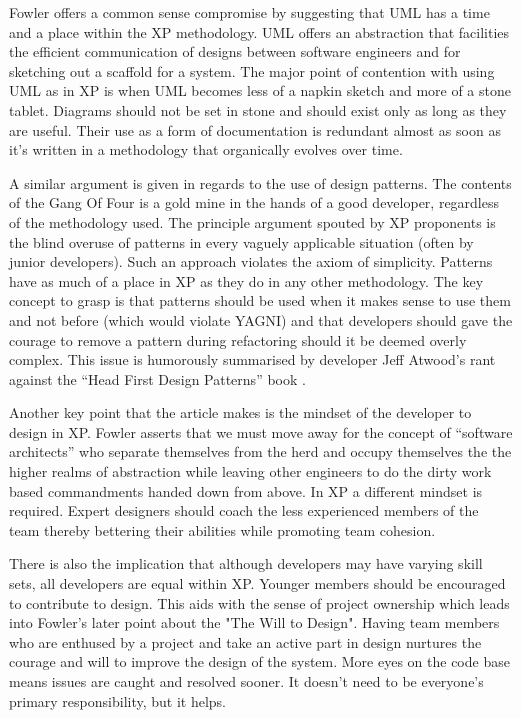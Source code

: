 \documentclass[paper=a4, fontsize=11pt]{scrartcl}	%
\numberwithin{equation}{section}															%
\numberwithin{figure}{section}																%
\numberwithin{table}{section}
\begin{document}
Fowler offers a common sense compromise by suggesting that UML has a time and a place within the XP methodology. UML offers an abstraction that facilities the efficient communication of designs between software engineers and for sketching out a scaffold for a system. The major point of contention with using UML as in XP is when UML becomes less of a napkin sketch and more of a stone tablet. Diagrams should not be set in stone and should exist only as long as they are useful. Their use as a form of documentation is redundant almost as soon as it's written in a methodology that organically evolves over time.

A similar argument is given in regards to the use of design patterns. The contents of the Gang Of Four \cite{gamma1994design} is a gold mine in the hands of a good developer, regardless of the methodology used. The principle argument spouted by XP proponents is the blind overuse of patterns in every vaguely applicable situation (often by junior developers). Such an approach violates the axiom of simplicity. Patterns have as much of a place in XP as they do in any other methodology. The key concept to grasp is that patterns should be used when it makes sense to use them and not before (which would violate YAGNI) and that developers should gave the courage to remove a pattern during refactoring should it be deemed overly complex. This issue is humorously summarised by developer Jeff Atwood's rant against the ``Head First Design Patterns'' book \cite{atwood2005head}.

Another key point that the article makes is the mindset of the developer to design in XP. Fowler asserts that we must move away for the concept of ``software architects'' who separate themselves from the herd and occupy themselves the the higher realms of abstraction while leaving other engineers to do the dirty work based commandments handed down from above. In XP a different mindset is required. Expert designers should coach the less experienced members of the team thereby bettering their abilities while promoting team cohesion. 

There is also the implication that although developers may have varying skill sets, all developers are equal within XP. Younger members should be encouraged to contribute to design. This aids with the sense of project ownership which leads into Fowler's later point about the "The Will to Design".  Having team members who are enthused by a project and take an active part in design nurtures the courage and will to improve the design of the system. More eyes on the code base means issues are caught and resolved sooner. It doesn't need to be everyone's primary responsibility, but it helps.
\end{document}
